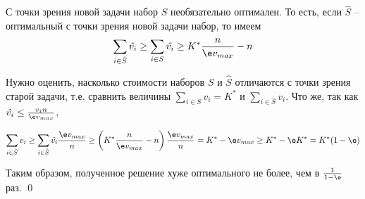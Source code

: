 С точки зрения новой задачи набор $S$ необязательно оптимален. То есть, если $\hat{S}$ -- оптимальный с точки зрения новой задачи набор, то имеем $$\sum_{i\in\hat S}\hat{v_i} \geq \sum_{i\in S} \hat{v_i} \geq K^*\frac{n}{\e v_{max}} - n$$

Нужно оценить, насколько стоимости наборов $S$ и $\hat S$ отличаются с точки зрения старой задачи, т.е. сравнить величины $\sum\limits_{i\in S}v_i = K^*$ и $\sum\limits_{i\in\hat S}v_i$. Что же, так как $\hat{v_i} \leq \frac{v_i n}{\e v_{max}}$,

$$\sum_{i\in\hat S}v_i \geq \sum_{i\in\hat S} \hat{v_i} \frac{\e v_{max}}{n} \geq \left(K^*\frac{n}{\e v_{max}} - n\right)\frac{\e v_{max}}{n} = K^* - \e v_{max} \geq K^* - \e K^* = K^*(1-\e)$$

Таким образом, полученное решение  хуже оптимального не более, чем в $\frac{1}{1-\e}$ раз. \qed